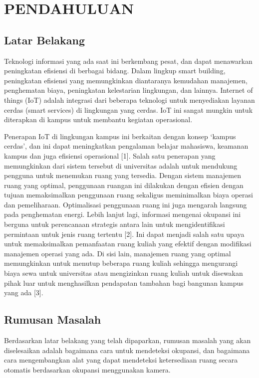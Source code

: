 \chapter{PENDAHULUAN}

\section{Latar Belakang}

Teknologi informasi yang ada saat ini berkembang pesat, dan dapat menawarkan peningkatan efisiensi di berbagai bidang. Dalam lingkup smart building, peningkatan efisiensi yang memungkinkan diantaranya kemudahan manajemen, penghematan biaya, peningkatan kelestarian lingkungan, dan lainnya. Internet of things (IoT) adalah integrasi dari beberapa teknologi untuk menyediakan layanan cerdas (smart services) di lingkungan yang cerdas. IoT ini sangat mungkin untuk diterapkan di kampus untuk membantu kegiatan operasional.


Penerapan IoT di lingkungan kampus ini berkaitan dengan konsep ‘kampus cerdas’, dan ini dapat meningkatkan pengalaman belajar mahasiswa, keamanan kampus dan juga efisiensi operasional [1]. 
Salah satu penerapan yang memungkinkan dari sistem tersebut di universitas adalah untuk mendukung pengguna untuk menemukan ruang yang tersedia. Dengan sistem manajemen ruang yang optimal, penggunaan ruangan ini dilakukan dengan efisien dengan tujuan memaksimalkan penggunaan ruang sekaligus meminimalkan biaya operasi dan pemeliharaan. Optimalisasi penggunaan ruang ini juga mengarah langsung pada penghematan energi. Lebih lanjut lagi, informasi mengenai okupansi ini berguna untuk perencanaan strategis antara lain untuk mengidentifikasi permintaan untuk jenis ruang tertentu [2]. Ini dapat menjadi salah satu upaya untuk memaksimalkan pemanfaatan ruang kuliah yang efektif dengan modifikasi manajemen operasi yang ada. Di sisi lain, manajemen ruang yang optimal memungkinkan untuk menutup beberapa ruang kuliah sehingga mengurangi biaya sewa untuk universitas atau mengizinkan ruang kuliah untuk disewakan pihak luar untuk menghasilkan pendapatan tambahan bagi bangunan kampus yang ada [3]. 


\section{Rumusan Masalah}

Berdasarkan latar belakang yang telah dipaparkan, rumusan masalah yang akan diselesaikan adalah bagaimana cara untuk mendeteksi okupansi, dan
bagaimana cara mengembangkan alat yang dapat mendeteksi ketersediaan ruang secara otomatis berdasarkan okupansi menggunakan kamera.


